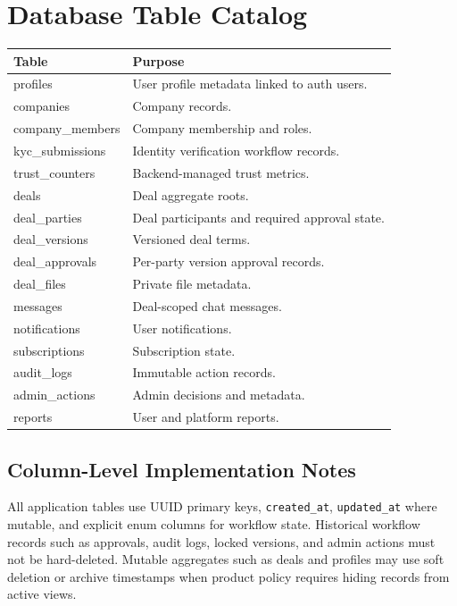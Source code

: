 \chapter{Database Table Catalog}
\begin{longtable}{p{}p{}}
\toprule
Table & Purpose \\
\midrule
profiles & User profile metadata linked to auth users. \\
companies & Company records. \\
company\_members & Company membership and roles. \\
kyc\_submissions & Identity verification workflow records. \\
trust\_counters & Backend-managed trust metrics. \\
deals & Deal aggregate roots. \\
deal\_parties & Deal participants and required approval state. \\
deal\_versions & Versioned deal terms. \\
deal\_approvals & Per-party version approval records. \\
deal\_files & Private file metadata. \\
messages & Deal-scoped chat messages. \\
notifications & User notifications. \\
subscriptions & Subscription state. \\
audit\_logs & Immutable action records. \\
admin\_actions & Admin decisions and metadata. \\
reports & User and platform reports. \\
\bottomrule
\end{longtable}

\section{Column-Level Implementation Notes}
All application tables use UUID primary keys, \texttt{created\_at}, \texttt{updated\_at} where mutable, and explicit enum columns for workflow state. Historical workflow records such as approvals, audit logs, locked versions, and admin actions must not be hard-deleted. Mutable aggregates such as deals and profiles may use soft deletion or archive timestamps when product policy requires hiding records from active views.
